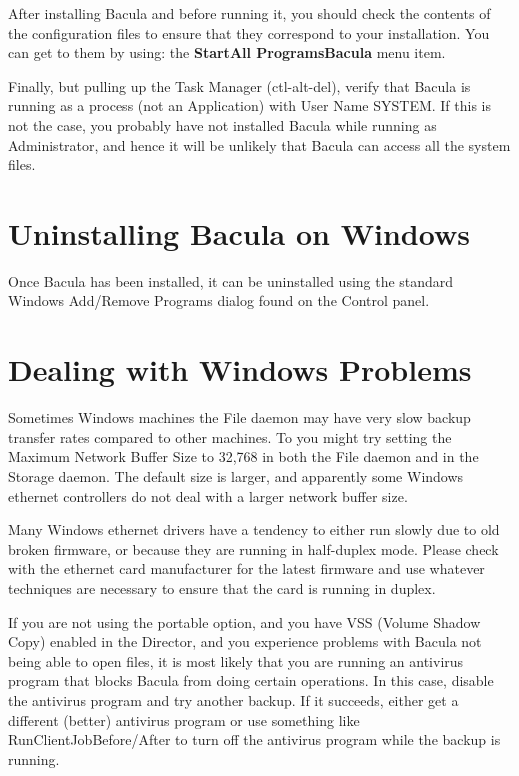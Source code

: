 After installing Bacula and before running it, you should check the contents
of the configuration files to ensure that they correspond to your
installation.  You can get to them by using:
the {\bf Start\-\gt{}All Programs\-\gt{}Bacula} menu item.

Finally, but pulling up the Task Manager (ctl-alt-del), verify that Bacula
is running as a process (not an Application) with User Name SYSTEM. If this is 
not the case, you probably have not installed Bacula while running as
Administrator, and hence it will be unlikely that Bacula can access
all the system files.

\section{Uninstalling Bacula on Windows}

Once Bacula has been installed, it can be uninstalled using the standard
Windows Add/Remove Programs dialog found on the Control panel. 

\section{Dealing with Windows Problems}
\label{problems}

Sometimes Windows machines the File daemon may have very slow
backup transfer rates compared to other machines.  To you might
try setting the Maximum Network Buffer Size to 32,768 in both the
File daemon and in the Storage daemon. The default size is larger,
and apparently some Windows ethernet controllers do not deal with          
a larger network buffer size.

Many Windows ethernet drivers have a tendency to either run slowly 
due to old broken firmware, or because they are running in half-duplex
mode. Please check with the ethernet card manufacturer for the latest
firmware and use whatever techniques are necessary to ensure that the 
card is running in duplex.

If you are not using the portable option, and you have VSS
(Volume Shadow Copy) enabled in the Director, and you experience
problems with Bacula not being able to open files, it is most
likely that you are running an antivirus program that blocks
Bacula from doing certain operations. In this case, disable the
antivirus program and try another backup.  If it succeeds, either
get a different (better) antivirus program or use something like
RunClientJobBefore/After to turn off the antivirus program while
the backup is running.

